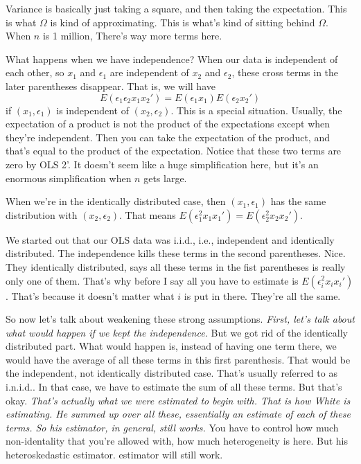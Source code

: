 \documentclass[11pt,a4paper]{amsart}
\theoremstyle{plain}
\theoremstyle{definition}
\begin{document}
   		 	 Variance is basically just taking a square, and then taking the expectation. This is what $\Omega$ is kind of approximating. This is what's kind of sitting behind $\Omega$. When $n$ is 1 million, There's way more terms here.\par 
   		 	 What happens when we have independence? When our data is independent of each other, so $x_{1}$ and $\epsilon_{1}$ are independent of $x_{2}$ and $\epsilon_{2}$, these cross terms in the later parentheses disappear. That is, we will have 
   		 	 \[	E(\epsilon_{1}\epsilon_{2}x_{1}x_{2}') = E(\epsilon_{1}x_{1})E(\epsilon_{2}x_{2}')	\] if $(x_{1},\epsilon_{1})$ is independent of $(x_{2}, \epsilon_{2})$.
   		 	 This is a special situation. Usually, the expectation of a product is not the product of the expectations except when they're independent. Then you can take the expectation of the product, and that's equal to the product of the expectation. Notice that these two terms are zero by OLS 2'. It doesn't seem like a huge simplification here, but it's an enormous simplification when $n$ gets large.\par 
   		 	 When we're in the identically distributed case, then $(x_{1},\epsilon_{1})$ has the same distribution with $(x_{2},\epsilon_{2})$. That means $E(\epsilon_{1}^{2}x_{1}x_{1}')= E(\epsilon_{2}^{2}x_{2}x_{2}')$.\par 
   		 	 We started out that our OLS data was i.i.d., i.e., independent and identically distributed. The independence kills these terms in the second parentheses. Nice. They identically distributed, says all these terms in the fist parentheses is really only one of them. That's why before I say all you have to estimate is $E(\epsilon_{i}^{2}x_{i}x_{i}')$. That's because it doesn't matter what $i$ is put in there. They're all the same.\par 
   		 	 So now let's talk about weakening these strong assumptions. \emph{First, let's talk about what would happen if we kept the independence.} But we got rid of the identically distributed part. What would happen is, instead of having one term there, we would have the average of all these terms in this first parenthesis. That would be the independent, not identically distributed case. That's usually referred to as i.n.i.d.. In that case, we have to estimate the sum of all these terms. But that's okay. \emph{That's actually what we were estimated to begin with. That is how White is estimating. He summed up over all these, essentially an estimate of each of these terms. So his estimator, in general, still works.} You have to control how much non-identality that you're allowed with, how much heterogeneity is here. But his heteroskedastic estimator.  estimator will still work.\par 
\end{document}
